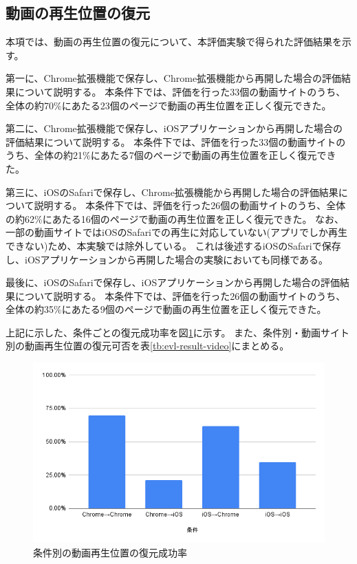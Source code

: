 \subsection{動画の再生位置の復元}
本項では、動画の再生位置の復元について、本評価実験で得られた評価結果を示す。

第一に、Chrome拡張機能で保存し、Chrome拡張機能から再開した場合の評価結果について説明する。
本条件下では、評価を行った33個の動画サイトのうち、全体の約70\%にあたる23個のページで動画の再生位置を正しく復元できた。

第二に、Chrome拡張機能で保存し、iOSアプリケーションから再開した場合の評価結果について説明する。
本条件下では、評価を行った33個の動画サイトのうち、全体の約21\%にあたる7個のページで動画の再生位置を正しく復元できた。

第三に、iOSのSafariで保存し、Chrome拡張機能から再開した場合の評価結果について説明する。
本条件下では、評価を行った26個の動画サイトのうち、全体の約62\%にあたる16個のページで動画の再生位置を正しく復元できた。
なお、一部の動画サイトではiOSのSafariでの再生に対応していない(アプリでしか再生できない)ため、本実験では除外している。
これは後述するiOSのSafariで保存し、iOSアプリケーションから再開した場合の実験においても同様である。

最後に、iOSのSafariで保存し、iOSアプリケーションから再開した場合の評価結果について説明する。
本条件下では、評価を行った26個の動画サイトのうち、全体の約35\%にあたる9個のページで動画の再生位置を正しく復元できた。

上記に示した、条件ごとの復元成功率を図\ref{fig:success-rate-video}に示す。
また、条件別・動画サイト別の動画再生位置の復元可否を表\ref{tb:evl-result-video}にまとめる。

\begin{figure}[htbp]
  \label{fig:success-rate-video}
  \begin{center}
    \includegraphics[bb=0 0 600 371,width=15cm]{img/060_evaluation/result/video/success-rate-video.pdf}
  \end{center}
  \caption{条件別の動画再生位置の復元成功率}
\end{figure}

